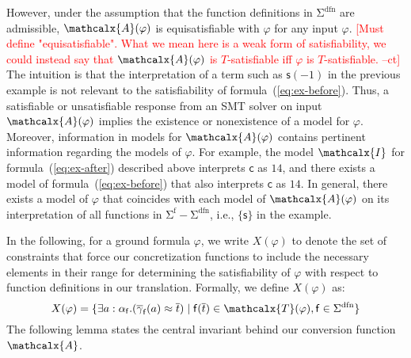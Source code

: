 \documentclass[runningheads,a4paper]{llncs}
\newcommand{\con}[1]{\mathsf{#1}}
\renewcommand\vec[1]{\overline{#1}}
\let\oldSigma=\Sigma
\def\Sigma{\mathrm{\oldSigma}}
\newcommand{\teq}{\approx}
\newcommand{\terms}{\mathcalx{T}}
\newcommand{\I}{\mathcalx{I}}
\newcommand{\conv}{\mathcalx{A}}
\newcommand{\sfuns}[1]{#1^\mathrm{f}}
\newcommand{\sfundefs}[1]{#1^\mathrm{dfn}}
\newcommand\concret{\gamma} %
\newcommand{\vecfarg}[1]{\vec{\concret}_{#1}}
\newcommand{\fargtype}[1]{\alpha_{#1}}
\newcommand{\rem}[1]{\textcolor{red}{[#1]}}
\newcommand{\ct}[1]{\rem{#1 --ct}}
\newcommand{\absconstraints}{X}
\begin{document}
However, under the assumption that the function definitions in
$\sfundefs{\Sigma}$ are admissible, %
$\conv(\varphi)$ is equisatisfiable with $\varphi$ for any input $\varphi$.
\ct{Must define "equisatisfiable".
What we mean here is a weak form of satisfiability, we could instead say that
$\conv(\varphi)$ is $T$-satisfiable iff $\varphi$ is $T$-satisfiable.
} 
The intuition is that the
interpretation of a term such as $\con{s}( -1 )$ in the previous example is not
relevant to the satisfiability of formula~(\ref{eq:ex-before}). Thus, a
satisfiable or unsatisfiable response from an SMT solver on input $\conv(
\varphi )$ implies the existence or nonexistence of a model for
$\varphi$. Moreover, information in models for $\conv( \varphi )$ contains
pertinent information regarding the models of $\varphi$. For example, the model
$\I$ for formula~(\ref{eq:ex-after}) described above interprets $\con{c}$ as $14$,
and there exists a model of formula~(\ref{eq:ex-before}) that also interprets $\con{c}$
as $14$. In general, there exists a model of $\varphi$ that
coincides with each model of $\conv( \varphi )$ on its interpretation of all
functions in $\sfuns{\Sigma} - \sfundefs{\Sigma}$, i.e., $\{
\con{s} \}$ in the example.


In the following, for a ground formula $\varphi$, 
we write $\absconstraints( \varphi )$ to denote the set of constraints 
that force our concretization functions to include the necessary elements in their range
for determining the satisfiability of $\varphi$ with respect to function definitions in our translation.
Formally, we define $\absconstraints( \varphi )$ as:
\[
\absconstraints( \varphi ) = \{ \exists a : {\fargtype{\con{f}}}. ( \vecfarg{\con{f}}( a ) \teq \vec t ) \mid \con{f}( \vec t ) \in \terms( \varphi ), \con{f} \in \sfundefs{\Sigma} \}
\]
The following lemma states the central invariant behind our conversion function $\conv$.
\end{document}
